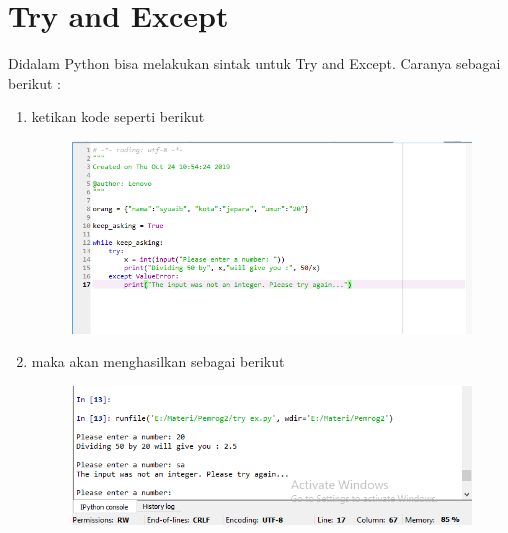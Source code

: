 \chapter*{Try and Except}

\par
Didalam Python bisa melakukan sintak untuk Try and Except. Caranya sebagai berikut :


\begin{enumerate}

	\item ketikan kode seperti berikut
	\begin{figure} [h]
	\includegraphics[width=12cm]{try/try1.png}
	\centering
	\end{figure}
	
	\item maka akan menghasilkan sebagai berikut
	\begin{figure} [h]
	\includegraphics[width=12cm]{try/try2.png}
	\centering
	\end{figure}
	
	
	
	
\end{enumerate}
